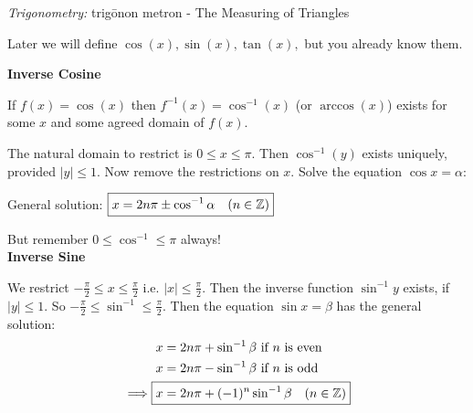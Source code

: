 \documentclass[10pt]{scrartcl}
\begin{document}

\emph{Trigonometry:} 
trigōnon metron 
 - The Measuring of Triangles

Later we will define $\cos(x), \sin(x), \tan(x),$ but you already know them. 

\textbf{Inverse Cosine}

If $f(x) = \cos(x)$ then $f^{-1}(x) = \cos^{-1}(x)$ (or $\arccos(x)$) exists for some $x$ and some agreed domain of $f(x)$. 
  \begin{center}
\end{center}

The natural domain to restrict is $0 \leq x \leq \pi$. Then $\cos^{-1}(y)$ exists uniquely, provided $|y| \leq 1$. Now remove the restrictions on $x$. Solve the equation $\cos x = \alpha$:

General solution: $\boxed{ x = 2n\pi \pm \cos^{-1}\alpha \quad (n \in \mathbb{Z})}$

But remember $0 \leq \cos^{-1} \leq \pi $ always!\\

\textbf{Inverse Sine}

  \begin{center}
\end{center}

We restrict $-\frac{\pi}{2} \leq x \leq \frac{\pi}{2}$ i.e. $|x| \leq \frac{\pi}{2}$. Then the inverse function $\sin^{-1}y$ exists, if $|y| \leq 1$. So $-\frac{\pi}{2} \leq \sin^{-1} \leq \frac{\pi}{2}$. Then the equation $\sin x = \beta$ has the general solution:
\[\begin{aligned}
x &= 2n\pi + \sin^{-1}\beta \mbox{ if $n$ is even}\\
x &= 2n\pi - \sin^{-1}\beta \mbox{ if $n$ is odd}\\
\implies \Aboxed{ x &= 2n\pi + (-1)^n \sin^{-1}\beta \quad (n \in \Z)}
\end{aligned}\]~
\end{document}

